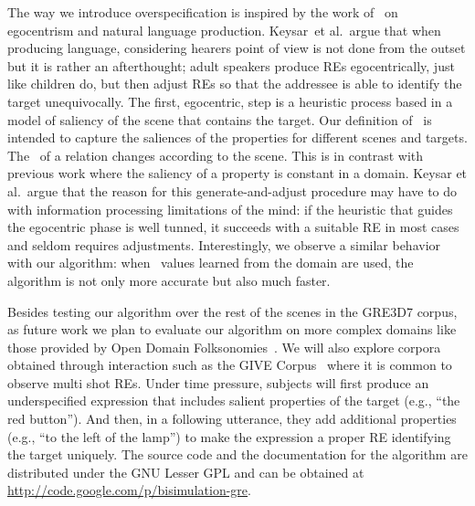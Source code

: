 The way we introduce overspecification is inspired by the work of~ on egocentrism and natural language production.  Keysar~et al.\ argue that when producing language, considering hearers point of view is not done from the outset but it is rather an afterthought; adult speakers produce REs egocentrically, just like children do, but then adjust REs so that the addressee is able to identify the target unequivocally. The first, egocentric, step is a heuristic process based in a model of saliency of the scene that contains the target. 
Our definition of \puse\ is intended to capture the saliences of the properties for different scenes and targets. The \puse\ of a relation changes according to the scene. This is in contrast with previous work where the saliency of a property is constant in a domain. Keysar et al.~argue that the reason for this generate-and-adjust procedure may have to do with information processing limitations of the mind: if the heuristic that guides the egocentric phase is well tunned, it succeeds with a suitable RE in most cases and seldom requires adjustments. Interestingly, we observe a similar behavior with our algorithm: when \puse\ values learned from the domain are used, the algorithm is not only more accurate but also much faster. 

Besides testing our algorithm over the rest of the scenes in the GRE3D7 corpus, 
as future work we plan to evaluate our algorithm on more complex domains 
like those provided by Open Domain Folksonomies~\cite{pacheco-duboue-dominguez:2012:NAACL-HLT}. We will also 
explore corpora obtained through interaction
such as the GIVE Corpus~\cite{GarGarKolStr10} where it is common to observe multi shot REs. Under time pressure, subjects will first produce an underspecified expression that includes salient properties of the target (e.g., ``the red button'').  And then, in a following utterance, they add additional properties (e.g., ``to the left of the lamp'') to make the expression a proper RE  identifying the target uniquely. The source code and the documentation for the algorithm are distributed under the GNU Lesser GPL and can be obtained at \url{http://code.google.com/p/bisimulation-gre}.
